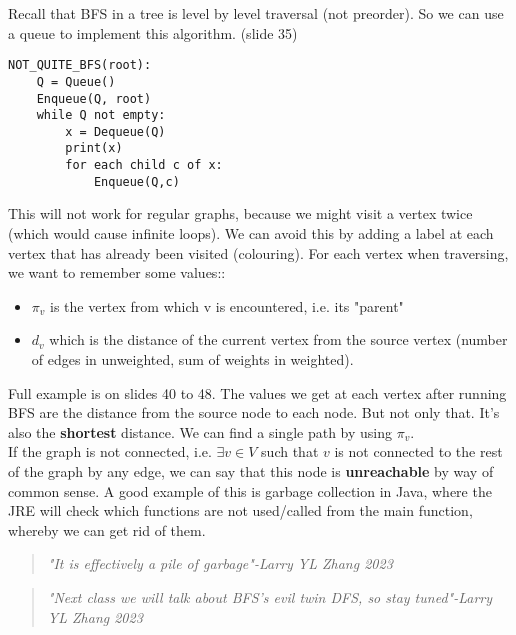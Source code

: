 \documentclass[12pt]{book}
\begin{document}
Recall that BFS in a tree is level by level traversal (not preorder). So we can use a queue to implement this algorithm. (slide 35)

\begin{lstlisting}
NOT_QUITE_BFS(root):
    Q = Queue()
    Enqueue(Q, root)
    while Q not empty:
        x = Dequeue(Q)
        print(x)
        for each child c of x:
            Enqueue(Q,c)
\end{lstlisting}

This will not work for regular graphs, because we might visit a vertex twice (which would cause infinite loops). We can avoid this by adding a label at each vertex that has already been visited (colouring). For each vertex when traversing, we want to remember some values::

\begin{itemize}
    \item $\pi_v$ is the vertex from which v is encountered, i.e. its "parent"
    \item $d_v$ which is the distance of the current vertex from the source vertex (number of edges in unweighted, sum of weights in weighted).
\end{itemize}

Full example is on slides 40 to 48. The values we get at each vertex after running BFS are the distance from the source node to each node. But not only that. It's also the \textbf{shortest} distance. We can find a single path by using $\pi_v$.\\

If the graph is not connected, i.e. $\exists v\in V$ such that $v$ is not connected to the rest of the graph by any edge, we can say that this node is \textbf{unreachable} by way of common sense. A good example of this is garbage collection in Java, where the JRE will check which functions are not used/called from the main function, whereby we can get rid of them.

\begin{quote}
    \textit{"It is effectively a pile of garbage"-Larry YL Zhang 2023}
\end{quote}

\begin{quote}
    \textit{"Next class we will talk about BFS's evil twin DFS, so stay tuned"-Larry YL Zhang 2023}
\end{quote}
\end{document}
